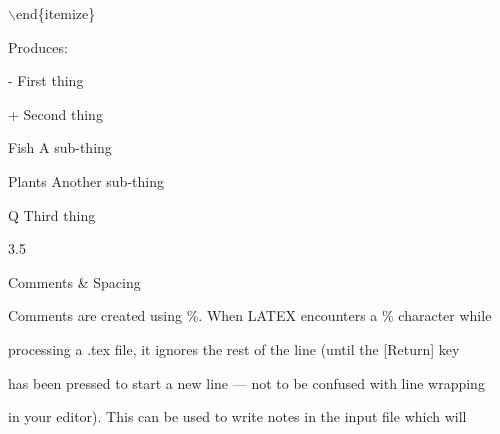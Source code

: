 \documentclass[a4paper,portrait,12pt]{article}
\begin{document}
\begin{flushleft}
\ensuremath{\backslash}end\{itemize\}
\end{flushleft}


\begin{flushleft}
Produces:
\end{flushleft}


\begin{flushleft}
- First thing
\end{flushleft}


\begin{flushleft}
+ Second thing
\end{flushleft}


\begin{flushleft}
Fish A sub-thing
\end{flushleft}


\begin{flushleft}
Plants Another sub-thing
\end{flushleft}


\begin{flushleft}
Q Third thing
\end{flushleft}





3.5





\begin{flushleft}
Comments \& Spacing
\end{flushleft}





\begin{flushleft}
Comments are created using \%. When LATEX encounters a \% character while
\end{flushleft}


\begin{flushleft}
processing a .tex file, it ignores the rest of the line (until the [Return] key
\end{flushleft}


\begin{flushleft}
has been pressed to start a new line --- not to be confused with line wrapping
\end{flushleft}


\begin{flushleft}
in your editor). This can be used to write notes in the input file which will
\end{flushleft}
\end{document}

